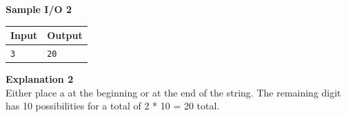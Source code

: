\documentclass{article}
\begin{document}
{\noindent \bf Sample I/O 2}\\
\begin{tabular}{|p{}|p{}|}
    \hline
    \textbf{Input} & \textbf{Output}\\
    \hline
    \texttt{3}
    &
    \texttt{20}\\
    \hline
\end{tabular} \newline \newline

{\noindent \bf Explanation 2}\\
Either place a  at the beginning or at the end of the string. The remaining digit has 10 possibilities for a total of 2 * 10 = 20 total.
\end{document}
